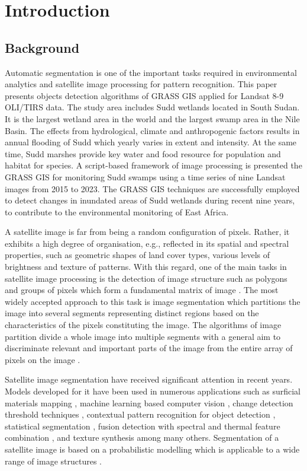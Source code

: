 \documentclass[analytics,article,submit,pdftex,moreauthors]{Definitions/mdpi}
\begin{document}
\section{Introduction}

\subsection{Background} 

Automatic segmentation is one of the important tasks required in environmental analytics and satellite image processing for pattern recognition. This paper presents objects detection algorithms of GRASS GIS applied for Landsat 8-9 OLI/TIRS data. The study area includes Sudd wetlands located in South Sudan. It is the largest wetland area in the world and the largest swamp area in the Nile Basin. The effects from hydrological, climate and anthropogenic factors results in annual flooding of Sudd which yearly varies in extent and intensity. At the same time, Sudd marshes provide key water and food resource for population and habitat for species. A script-based framework of image processing is presented the GRASS GIS for monitoring Sudd swamps using a time series of nine Landsat images from 2015 to 2023. The GRASS GIS techniques are successfully employed to detect changes in inundated areas of Sudd wetlands during recent nine years, to contribute to the environmental monitoring of East Africa.

A satellite image is far from being a random configuration of pixels. Rather, it exhibits a high degree of organisation, e.g., reflected in its spatial and spectral properties, such as geometric shapes of land cover types, various levels of brightness and texture of patterns. With this regard, one of the main tasks in satellite image processing is the detection of image structure such as polygons and groups of pixels which form a fundamental matrix of image \cite{Solomon}. The most widely accepted approach to this task is image segmentation which partitions the image into several segments representing distinct regions based on the characteristics of the pixels constituting the image. The algorithms of image partition divide a whole image into multiple segments with a general aim to discriminate relevant and important parts of the image from the entire array of pixels on the image \cite{LI202326,DONG2022109695,WANG2023110415}. 

Satellite image segmentation have received significant attention in recent years. Models developed for it have been used in numerous applications such as surficial materials mapping \cite{6947039}, machine learning based computer vision \cite{8914551}, change detection threshold techniques \cite{6005084}, contextual pattern recognition for object detection \cite{10006917,9719051,4284070}, statistical segmentation \cite{7730056,7877513}, fusion detection with spectral and thermal feature combination \cite{7730710}, and texture synthesis \cite{576322} among many others.
Segmentation of a satellite image is based on a probabilistic modelling which is applicable to a wide range of image structures \cite{Buscombe}. 
\end{document}
